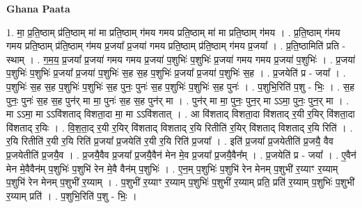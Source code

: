 \documentclass[17pt]{extarticle}
\begin{document}
\textbf{Ghana Paata } \newline

1. मा॒ प्र॒ति॒ष्ठाम् प्र॑ति॒ष्ठाम् मा॑ मा प्रति॒ष्ठाम् ग॑मय गमय प्रति॒ष्ठाम् मा॑ मा प्रति॒ष्ठाम् ग॑मय । . प्र॒ति॒ष्ठाम् ग॑मय गमय प्रति॒ष्ठाम् प्र॑ति॒ष्ठाम् ग॑मय प्र॒जया᳚ प्र॒जया॑ गमय प्रति॒ष्ठाम् प्र॑ति॒ष्ठाम् ग॑मय प्र॒जया᳚ । . प्र॒ति॒ष्ठामिति॑ प्रति - स्थाम् । . ग॒म॒य॒ प्र॒जया᳚ प्र॒जया॑ गमय गमय प्र॒जया॑ प॒शुभिः॑ प॒शुभिः॑ प्र॒जया॑ गमय गमय प्र॒जया॑ प॒शुभिः॑ । . प्र॒जया॑ प॒शुभिः॑ प॒शुभिः॑ प्र॒जया᳚ प्र॒जया॑ प॒शुभिः॑ स॒ह स॒ह प॒शुभिः॑ प्र॒जया᳚ प्र॒जया॑ प॒शुभिः॑ स॒ह । . प्र॒जयेति॑ प्र - जया᳚ । . प॒शुभिः॑ स॒ह स॒ह प॒शुभिः॑ प॒शुभिः॑ स॒ह पुनः॒ पुनः॑ स॒ह प॒शुभिः॑ प॒शुभिः॑ स॒ह पुनः॑ । . प॒शुभि॒रिति॑ प॒शु - भिः॒ । . स॒ह पुनः॒ पुनः॑ स॒ह स॒ह पुन॑र् मा मा॒ पुनः॑ स॒ह स॒ह पुन॑र् मा । . पुन॑र् मा मा॒ पुनः॒ पुन॒र् मा ऽऽमा॒ पुनः॒ पुन॒र् मा । . मा ऽऽमा॒ मा ऽऽवि॑शताद् विशता॒दा मा॒ मा ऽऽवि॑शतात् । . आ वि॑शताद् विशता॒दा वि॑शताद् र॒यी र॒यिर् वि॑शता॒दा वि॑शताद् र॒यिः । . वि॒श॒ता॒द् र॒यी र॒यिर् वि॑शताद् विशताद् र॒यि रितीति॑ र॒यिर् वि॑शताद् विशताद् र॒यि रिति॑ । . र॒यि रितीति॑ र॒यी र॒यि रिति॑ प्र॒जया᳚ प्र॒जयेति॑ र॒यी र॒यि रिति॑ प्र॒जया᳚ । . इति॑ प्र॒जया᳚ प्र॒जयेतीति॑ प्र॒जयै॒ वैव प्र॒जयेतीति॑ प्र॒जयै॒व । . प्र॒जयै॒वैव प्र॒जया᳚ प्र॒जयै॒वैन॑ मेन मे॒व प्र॒जया᳚ प्र॒जयै॒वैन᳚म् । . प्र॒जयेति॑ प्र - जया᳚ । . ए॒वैन॑ मेन मे॒वैवैन॑म् प॒शुभिः॑ प॒शुभि॑ रेन मे॒वै वैन॑म् प॒शुभिः॑ । . ए॒न॒म् प॒शुभिः॑ प॒शुभि॑ रेन मेनम् प॒शुभी॑ र॒य्याꣳ र॒य्याम् प॒शुभि॑ रेन मेनम् प॒शुभी॑ र॒य्याम् । . प॒शुभी॑ र॒य्याꣳ र॒य्याम् प॒शुभिः॑ प॒शुभी॑ र॒य्याम् प्रति॒ प्रति॑ र॒य्याम् प॒शुभिः॑ प॒शुभी॑ र॒य्याम् प्रति॑ । . प॒शुभि॒रिति॑ प॒शु - भिः॒ । \newline
\end{document}
